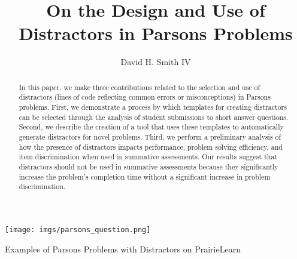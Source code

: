 \documentclass[]{acmart}
\begin{document}


\title{On the Design and Use of Distractors in Parsons Problems}

\author{David H. Smith IV}


\begin{abstract}

    In this paper, we make three contributions related to the selection and use
    of distractors (lines of code reflecting common errors or misconceptions)
    in Parsons problems.  First, we demonstrate a process by which
    templates for creating distractors can be selected through the analysis of
    student submissions to short answer questions. Second, we describe the
    creation of a tool that uses these templates to automatically generate
    distractors for novel problems. Third, we perform a preliminary analysis
    of how the presence of distractors impacts performance, problem solving
    efficiency, and item discrimination when used in summative assessments. Our
    results suggest that distractors should not be used in summative assessments
    because they significantly increase the problem's completion time without a
    significant increase in problem discrimination.

\end{abstract}


\begin{teaserfigure}
    \centering
    \texttt{[image: imgs/parsons\_question.png]}
    \caption{Examples of Parsons Problems with Distractors on PrairieLearn}
\end{teaserfigure}

\maketitle
\end{document}
